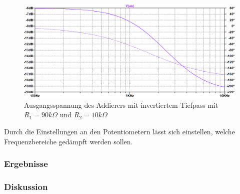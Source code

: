 \newpage
\begin{figure}[htb]
    \includegraphics[width=16cm]{./pictures/Gesamtschaltung_Invertiert_90_10}
    \caption{Ausgangsspannung des Addierers mit invertiertem Tiefpass mit $R_1 = 90k\Omega$ und $R_2 = 10k\Omega$}
    \label{fig:AddiererAusgangsspannungInvertiert}
\end{figure}

Durch die Einstellungen an den Potentiometern lässt sich einstellen, welche Frequenzbereiche gedämpft werden sollen.
\subsubsection{Ergebnisse}

\subsubsection{Diskussion}
